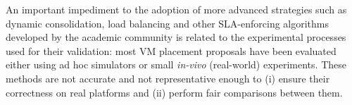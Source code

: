 An important impediment to the adoption of more advanced strategies
such as dynamic consolidation, load balancing and other SLA-enforcing
algorithms developed by the academic community
\cite{feller:ccgrid12,Hermenier:2009:ECM:1508293.1508300,quesnel:cpe2012,5328077,5935254}
is related to the experimental processes used for their validation:
most VM placement proposals have been evaluated either using ad hoc
simulators or small \textit {in-vivo} (\ie real-world)
experiments. These methods are not accurate and not representative
enough to (i) ensure their correctness on real platforms and (ii)
perform fair comparisons between them.
%
